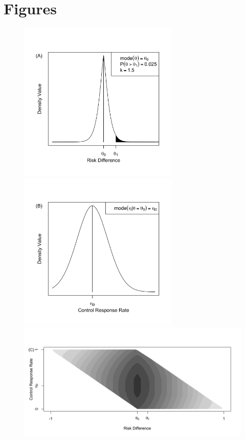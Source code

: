 \documentclass[12pt]{article}
\begin{document}
\section*{Figures}
%
\begin{figure}[htbp]
\begin{center}
\includegraphics[width=3in]{./figures/figure5a_NEW.png}
\includegraphics[width=3in]{./figures/figure5b_NEW.png}
\includegraphics[width=6in]{./figures/figure5a.png}

\end{center}
\end{figure}
\end{document}
